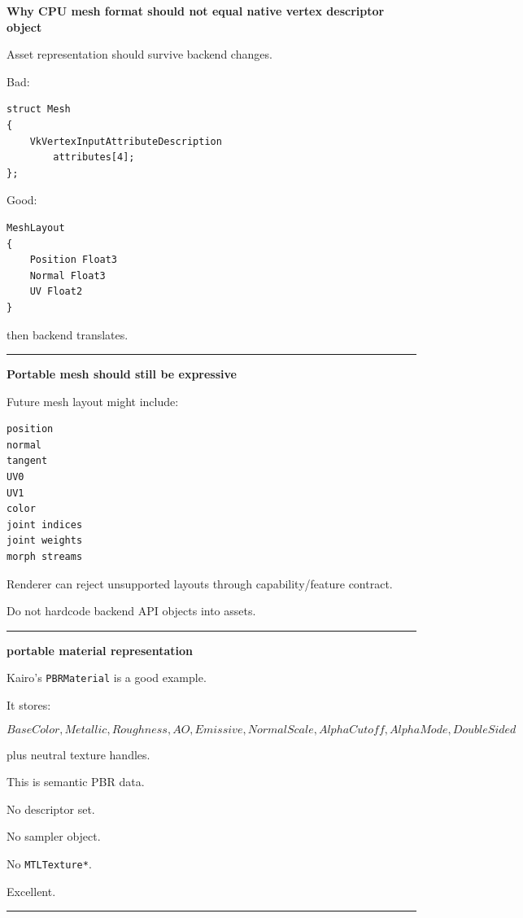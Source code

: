 \textbf{Why CPU mesh format should not equal native vertex descriptor object}

Asset representation should survive backend changes.

Bad:

\begin{verbatim}
struct Mesh
{
    VkVertexInputAttributeDescription
        attributes[4];
};
\end{verbatim}

Good:

\begin{verbatim}
MeshLayout
{
    Position Float3
    Normal Float3
    UV Float2
}
\end{verbatim}

then backend translates.

\begin{center}\rule{0.5\linewidth}{0.5pt}\end{center}

\textbf{Portable mesh should still be expressive}

Future mesh layout might include:

\begin{verbatim}
position
normal
tangent
UV0
UV1
color
joint indices
joint weights
morph streams
\end{verbatim}

Renderer can reject unsupported layouts through capability/feature contract.

Do not hardcode backend API objects into assets.

\begin{center}\rule{0.5\linewidth}{0.5pt}\end{center}

\textbf{portable material representation}

Kairo's \texttt{PBRMaterial} is a good example.

It stores:

\[
BaseColor,
Metallic,
Roughness,
AO,
Emissive,
NormalScale,
AlphaCutoff,
AlphaMode,
DoubleSided
\]

plus neutral texture handles.

This is semantic PBR data.

No descriptor set.

No sampler object.

No \texttt{MTLTexture*}.

Excellent.

\begin{center}\rule{0.5\linewidth}{0.5pt}\end{center}

